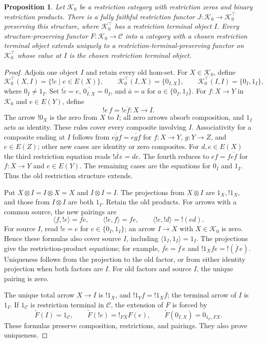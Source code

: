 \documentclass[11pt]{article}
\newtheorem{proposition}[theorem]{Proposition}
\theoremstyle{definition}
\theoremstyle{remark}
\begin{document}
\begin{proposition}\label{prop:free-restriction-terminal}
Let $\mathcal K_0$ be a restriction category with restriction zeros
and binary restriction products. There is a fully faithful
restriction functor $J:\mathcal K_0\to\mathcal K_0^\top$ preserving
this structure, where $\mathcal K_0^\top$ has a restriction terminal
object $I$. Every structure-preserving functor
$F:\mathcal K_0\to\mathcal C$ into a category with a chosen
restriction terminal object extends uniquely to a
restriction-terminal-preserving functor on $\mathcal K_0^\top$
whose value at $I$ is the chosen restriction terminal object.
\end{proposition}
\begin{proof}
Adjoin one object $I$ and retain every old hom-set. For
$X\in\mathcal K_0$, define
\[
 \mathcal K_0^\top(X,I)=\{!e\mid e\in E(X)\},\qquad
 \mathcal K_0^\top(I,X)=\{0_{I,X}\},\qquad
 \mathcal K_0^\top(I,I)=\{0_I,1_I\},
\]
where $0_I\ne1_I$. Set $\overline{!e}=e$,
$\overline{0_{I,X}}=0_I$, and $\overline a=a$ for
$a\in\{0_I,1_I\}$. For $f:X\to Y$ in $\mathcal K_0$ and
$e\in E(Y)$, define
\[
 !e\,f= !\overline{ef}:X\longrightarrow I.
\]
The arrow $!0_X$ is the zero from $X$ to $I$; all zero arrows
absorb composition, and $1_I$ acts as identity. These rules cover
every composite involving $I$. Associativity for a composite
ending at $I$ follows from
$\overline{\overline{eg}f}=\overline{egf}$ for
$f:X\to Y$, $g:Y\to Z$, and $e\in E(Z)$; other new cases
are identity or zero composites. For $d,e\in E(X)$ the third
restriction equation reads $\overline{!d\,e}=de$.
The fourth reduces to $ef=f\overline{ef}$ for $f:X\to Y$
and $e\in E(Y)$. The remaining cases are the equations for
$0_I$ and $1_I$. Thus the old restriction structure extends.

Put $X\otimes I=I\otimes X=X$ and $I\otimes I=I$.
The projections from $X\otimes I$ are $1_X,!1_X$, and those
from $I\otimes I$ are both $1_I$. Retain the old products.
For arrows with a common source, the new pairings are
\[
 \langle f,!e\rangle=fe,\qquad
 \langle !e,f\rangle=fe,\qquad
 \langle !e,!d\rangle=!(ed).
\]
For source $I$, read $!e=e$ for $e\in\{0_I,1_I\}$;
an arrow $I\to X$ with $X\in\mathcal K_0$ is zero. Hence these
formulas also cover source $I$, including
$\langle1_I,1_I\rangle=1_I$. The projections give the
restriction-product equations; for example,
$\overline{fe}=\overline f\,e$ and
$!1_Xfe=!(\overline f\,e)$. Uniqueness follows from the
projection to the old factor, or from either identity projection
when both factors are $I$. For old factors and source $I$,
the unique pairing is zero.

The unique total arrow $X\to I$ is $!1_X$, and
$!1_Yf=!1_X\overline f$; the terminal arrow of $I$ is $1_I$.
If $1_{\mathcal C}$ is restriction terminal in $\mathcal C$,
the extension of $F$ is forced by
\[
 \widetilde F(I)=1_{\mathcal C},\qquad
 \widetilde F(!e)=!_{FX}F(e),\qquad
 \widetilde F(0_{I,X})=0_{1_{\mathcal C},FX}.
\]
These formulas preserve composition, restrictions, and pairings.
They also prove uniqueness.
\end{proof}
\end{document}
